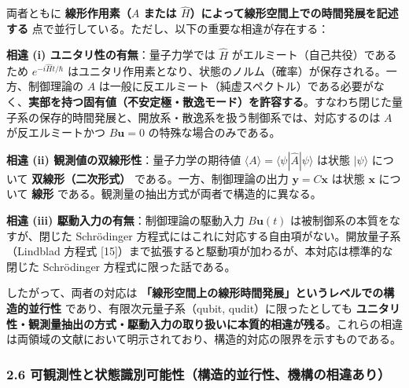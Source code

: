 \documentclass[
]{ltjsarticle}
\begin{document}
両者ともに \textbf{線形作用素（\(A\) または
\(\hat{H}\)）によって線形空間上での時間発展を記述する}
点で並行している。ただし、以下の重要な相違が存在する：

\textbf{相違 (i) ユニタリ性の有無}：量子力学では \(\hat{H}\)
がエルミート（自己共役）であるため \(e^{-i\hat{H}t/\hbar}\)
はユニタリ作用素となり、状態のノルム（確率）が保存される。一方、制御理論の
\(A\)
は一般に反エルミート（純虚スペクトル）である必要がなく、\textbf{実部を持つ固有値（不安定極・散逸モード）を許容する}。すなわち閉じた量子系の保存的時間発展と、開放系・散逸系を扱う制御系では、対応するのは
\(A\) が反エルミートかつ \(B\mathbf{u} = 0\) の特殊な場合のみである。

\textbf{相違 (ii) 観測値の双線形性}：量子力学の期待値
\(\langle A\rangle = \langle\psi|\hat{A}|\psi\rangle\) は状態
\(|\psi\rangle\) について \textbf{双線形（二次形式）}
である。一方、制御理論の出力 \(\mathbf{y} = C\mathbf{x}\) は状態
\(\mathbf{x}\) について \textbf{線形}
である。観測量の抽出方式が両者で構造的に異なる。

\textbf{相違 (iii) 駆動入力の有無}：制御理論の駆動入力
\(B\mathbf{u}(t)\) は被制御系の本質をなすが、閉じた Schrödinger
方程式にはこれに対応する自由項がない。開放量子系（Lindblad 方程式
{[}15{]}）まで拡張すると駆動項が加わるが、本対応は標準的な閉じた
Schrödinger 方程式に限った話である。

したがって、両者の対応は
\textbf{「線形空間上の線形時間発展」というレベルでの構造的並行性}
であり、有限次元量子系（qubit, qudit）に限ったとしても
\textbf{ユニタリ性・観測量抽出の方式・駆動入力の取り扱いに本質的相違が残る}。これらの相違は両領域の文献において明示されており、構造的対応の限界を示すものである。

\subsubsection{2.6
可観測性と状態識別可能性（構造的並行性、機構の相違あり）}\label{ux53efux89b3ux6e2cux6027ux3068ux72b6ux614bux8b58ux5225ux53efux80fdux6027ux69cbux9020ux7684ux4e26ux884cux6027ux6a5fux69cbux306eux76f8ux9055ux3042ux308a}
\end{document}
